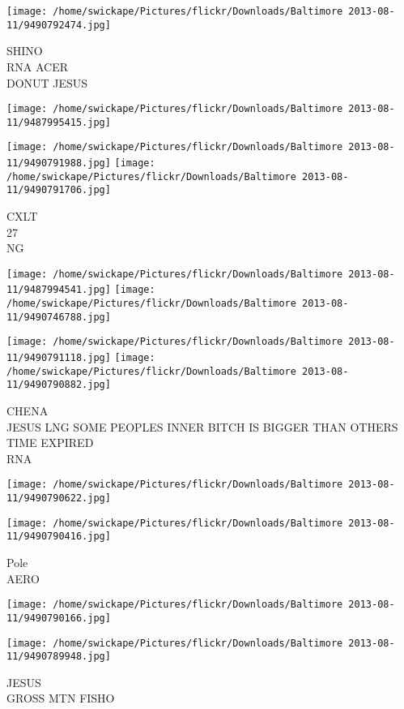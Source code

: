 \documentclass[10pt,letterpaper]{article}
\begin{document}
\texttt{[image: /home/swickape/Pictures/flickr/Downloads/Baltimore 2013-08-11/9490792474.jpg]}

SHINO\\
RNA ACER\\
DONUT JESUS
\pagebreak

\texttt{[image: /home/swickape/Pictures/flickr/Downloads/Baltimore 2013-08-11/9487995415.jpg]}

\vspace{0.25in}
\texttt{[image: /home/swickape/Pictures/flickr/Downloads/Baltimore 2013-08-11/9490791988.jpg]}
\texttt{[image: /home/swickape/Pictures/flickr/Downloads/Baltimore 2013-08-11/9490791706.jpg]}

CXLT\\
27\\
NG
\pagebreak

\texttt{[image: /home/swickape/Pictures/flickr/Downloads/Baltimore 2013-08-11/9487994541.jpg]}
\texttt{[image: /home/swickape/Pictures/flickr/Downloads/Baltimore 2013-08-11/9490746788.jpg]}

\texttt{[image: /home/swickape/Pictures/flickr/Downloads/Baltimore 2013-08-11/9490791118.jpg]}
\texttt{[image: /home/swickape/Pictures/flickr/Downloads/Baltimore 2013-08-11/9490790882.jpg]}

CHENA\\
JESUS LNG SOME PEOPLES INNER BITCH IS BIGGER THAN OTHERS\\
TIME EXPIRED\\
RNA
\pagebreak

\texttt{[image: /home/swickape/Pictures/flickr/Downloads/Baltimore 2013-08-11/9490790622.jpg]}

\vspace{0.25in}
\texttt{[image: /home/swickape/Pictures/flickr/Downloads/Baltimore 2013-08-11/9490790416.jpg]}

Pole\\
AERO
\pagebreak

\texttt{[image: /home/swickape/Pictures/flickr/Downloads/Baltimore 2013-08-11/9490790166.jpg]}

\vspace{0.25in}
\texttt{[image: /home/swickape/Pictures/flickr/Downloads/Baltimore 2013-08-11/9490789948.jpg]}

JESUS\\
GROSS MTN FISHO
\pagebreak
\end{document}
